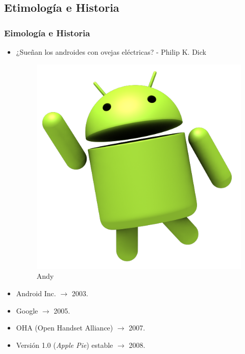 \subsection{Etimología e Historia}
\begin{frame}
  \frametitle{Eimología e Historia}
  \begin{itemize}
    \item ¿Sueñan los androides con ovejas eléctricas? - Philip K. Dick
    \begin{figure}
  \includegraphics[scale=0.1]{images/andy.png}
  \caption{Andy}
    \end{figure}
    
    \item Android Inc. $\rightarrow$ 2003.
    
    \item Google $\rightarrow$ 2005.
    
    \item OHA (Open Handset Alliance) $\rightarrow$ 2007.
    
    \item Versión 1.0 (\emph{Apple Pie}) estable $\rightarrow$ 2008.
  \end{itemize}
\end{frame}

